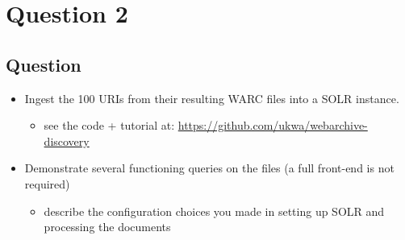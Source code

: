 \chapter{Question 2}
\label{question-2}
\section{Question}



\begin{itemize}
\item Ingest the 100 URIs from their resulting WARC files into a SOLR instance.
\begin{itemize}
\item  see the code + tutorial at:  \hyperref[savePage]{https://github.com/ukwa/webarchive-discovery}
\end{itemize}
\item Demonstrate several functioning queries on the files (a full front-end is not required)
\begin{itemize}
\item  describe the configuration choices you made in setting up SOLR and processing the documents	
\end{itemize}
\end{itemize}

